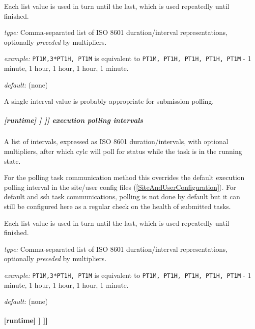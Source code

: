 Each list value is used in turn until the last, which is used repeatedly
until finished.

\begin{myitemize}
    \item {\em type:} Comma-separated list of ISO 8601 duration/interval
        representations, optionally {\em preceded} by multipliers.
    \item {\em example:} \lstinline=PT1M,3*PT1H, PT1M= is equivalent to
    \lstinline=PT1M, PT1H, PT1H, PT1H, PT1M= - 1 minute, 1 hour, 1 hour, 1
    hour, 1 minute.
    \item {\em default:} (none)
\end{myitemize}
A single interval value is probably appropriate for submission polling.

\subparagraph[execution polling intervals]{[runtime] \textrightarrow [[\_\_NAME\_\_]] \textrightarrow [[[job]]] \textrightarrow execution polling intervals}
\label{ExecutionPollingIntervals}

A list of intervals, expressed as ISO 8601 duration/intervals, with optional
multipliers, after which cylc will poll for status while the task is in the
running state.

For the polling task communication method this overrides the default
execution polling interval in the site/user config files
(\ref{SiteAndUserConfiguration}). For default and ssh task communications,
polling is not done by default but it can still be configured here as a
regular check on the health of submitted tasks.

Each list value is used in turn until the last, which is used repeatedly
until finished.

\begin{myitemize}
    \item {\em type:} Comma-separated list of ISO 8601 duration/interval
        representations, optionally {\em preceded} by multipliers.
    \item {\em example:} \lstinline=PT1M,3*PT1H, PT1M= is equivalent to
    \lstinline=PT1M, PT1H, PT1H, PT1H, PT1M= - 1 minute, 1 hour, 1 hour, 1
    hour, 1 minute.
    \item {\em default:} (none)
\end{myitemize}

\paragraph[{[[[}remote{]]]}]{[runtime] \textrightarrow [[\_\_NAME\_\_]] \textrightarrow [[[remote]]]}

